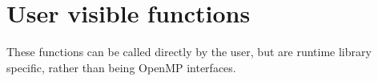 \hypertarget{group__USER}{\section{User visible functions}
\label{group__USER}
}
These functions can be called directly by the user, but are runtime library specific, rather than being Open\-M\-P interfaces. 